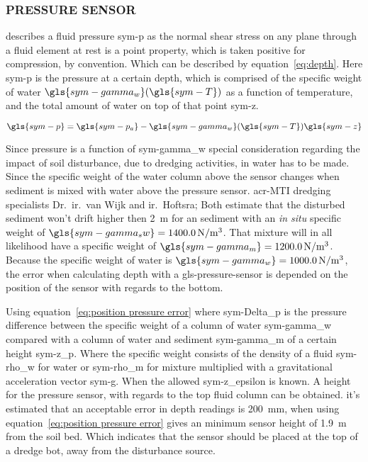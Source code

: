 \subsubsection{PRESSURE SENSOR}\label{sec:pressure sensor}

\citet{white_fluid_2011} describes a fluid pressure \gls{sym-p} as the normal shear stress on any plane through a fluid
element at rest is a point property, which is taken positive for compression, by convention. Which can be described by
equation~\ref{eq:depth}. Here \gls{sym-p} is the pressure at a certain depth, which is comprised of the specific weight
of water \( \gls{sym-gamma_w}(\gls{sym-T}) \) as a function of temperature, and the total amount of water on top of
that point \gls{sym-z}.

\begin{equation}
    \label{eq:depth}
    \gls{sym-p} = \gls{sym-p_a} - \gls{sym-gamma_w}(\gls{sym-T}) \gls{sym-z}
\end{equation}

Since pressure is a function of \gls{sym-gamma_w} special consideration regarding the impact of soil disturbance, due to
dredging activities, in water has to be made. Since the specific weight of the water column above the sensor changes
when sediment is mixed with water above the pressure sensor. \gls{acr-MTI} dredging specialists Dr.~ir.~van Wijk and
ir.~Hoftsra; Both estimate that the disturbed sediment won't drift higher then \SI{2}{\meter} for an sediment with an
\emph{in situ} specific weight of \( \gls{sym-gamma_sw} = \SI{1400}{\N\per\cubic\meter} \). That mixture will in all
likelihood have a specific weight of \( \gls{sym-gamma_m} = \SI{1200}{\N\per\cubic\meter} \). Because the specific
weight of water is \( \gls{sym-gamma_w} = \SI{1000}{\N\per\cubic\meter} \), the error when calculating depth with a
\gls{gls-pressure-sensor} is depended on the position of the sensor with regards to the bottom.

Using equation~\ref{eq:position pressure error} where \gls{sym-Delta_p} is the pressure difference between the specific
weight of a column of water \gls{sym-gamma_w} compared with a column of water and sediment  \gls{sym-gamma_m}  of a
certain height \gls{sym-z_p}. Where the specific weight consists of the density of a fluid \gls{sym-rho_w} for water or
\gls{sym-rho_m} for mixture multiplied with a gravitational acceleration vector \gls{sym-g}. When the allowed
\gls{sym-z_epsilon} is known. A height for the pressure sensor, with regards to the top fluid column can be
obtained. it's estimated that an acceptable error in depth readings is \SI{200}{\mm}, when using
equation~\ref{eq:position pressure error} gives an minimum sensor height of \SI{1.9}{\meter} from the soil bed. Which
indicates that the sensor should be placed at the top of a dredge bot, away from the disturbance source.

